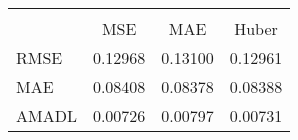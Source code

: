 \begin{tabular}{lccc}
\hline\hline \\ [-1.8ex]
 & MSE & MAE & Huber \\ 
 \hline 
RMSE & 0.12968 & 0.13100 & 0.12961 \\ 
MAE & 0.08408 & 0.08378 & 0.08388 \\ 
AMADL & 0.00726 & 0.00797 & 0.00731 \\ 
\hline\hline
\end{tabular}
